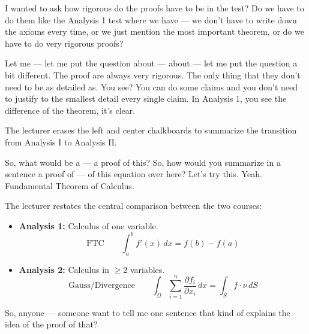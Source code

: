 \begin{student-interaction}
I wanted to ask how rigorous do the proofs have to be in the test? Do we have to do them like the Analysis 1 test where we have --- we don't have to write down the axioms every time, or we just mention the most important theorem, or do we have to do very rigorous proofs?
\end{student-interaction}

\begin{spoken-clean}[continued]
Let me --- let me put the question about --- about --- let me put the question a bit different. The proof are always very rigorous. The only thing that they don't need to be as detailed as. You see? You can do some claims and you don't need to justify to the smallest detail every single claim. In Analysis 1, you see the difference of the theorem, it's clear.
\end{spoken-clean}

\begin{meta-note}
The lecturer erases the left and center chalkboards to summarize the transition from Analysis I to Analysis II.
\end{meta-note}

\begin{spoken-clean}[00:12:33 - 00:13:17]
So, what would be a --- a proof of this? So, how would you summarize in a sentence a proof of --- of this equation over here? Let's try this.  Yeah. Fundamental Theorem of Calculus. 
\end{spoken-clean}

\begin{math-stroke}
The lecturer restates the central comparison between the two courses:
\begin{itemize}
    \item \textbf{Analysis 1:} Calculus of one variable.
    \[ \text{FTC} \qquad \int_{a}^{b} f'(x) \, dx = f(b) - f(a) \]
    \item \textbf{Analysis 2:} Calculus in $\ge 2$ variables.
    \[ \text{Gauss/Divergence} \qquad \int_{\Omega} \sum_{i=1}^n \frac{\partial f_i}{\partial x_i} \, dx = \int_{S} f \cdot \nu \, dS \]
\end{itemize}
\end{math-stroke}

\begin{spoken-clean}[00:13:17 - 00:15:18]
So, anyone --- someone want to tell me one sentence that kind of explains the idea of the proof of that? 
\end{spoken-clean}

